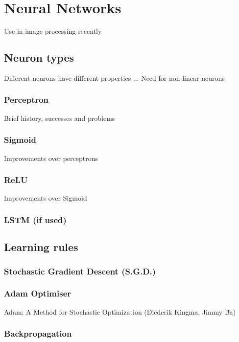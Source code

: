 
\pagebreak
\section{Neural Networks}     %
Use in image processing recently

\subsection{Neuron types}
Different neurons have different properties ...
Need for non-linear neurons

\subsubsection{Perceptron}
Brief history, successes and problems

\subsubsection{Sigmoid}
Improvements over perceptrons

\subsubsection{ReLU}
Improvements over Sigmoid

\subsubsection{LSTM (if used)}


\pagebreak
\subsection{Learning rules}

\subsubsection{Stochastic Gradient Descent (S.G.D.)}

\subsubsection{Adam Optimiser}
Adam: A Method for Stochastic Optimization (Diederik Kingma, Jimmy Ba)

\subsubsection{Backpropagation}

